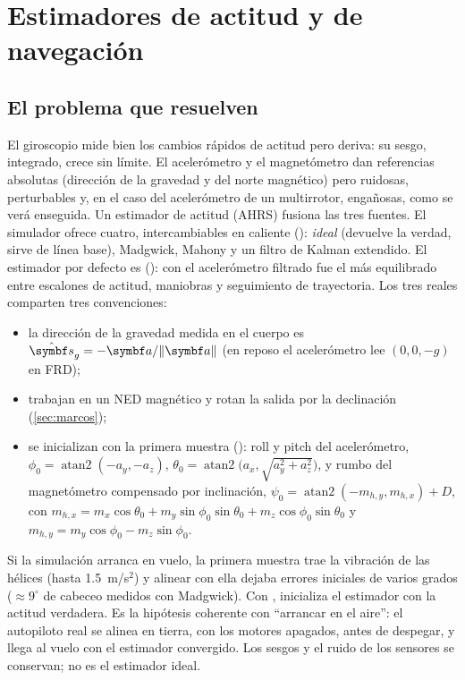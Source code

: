 \section{Estimadores de actitud y de navegación}
\label{sec:estimadores}

\subsection{El problema que resuelven}

El giroscopio mide bien los cambios rápidos de actitud pero deriva: su
sesgo, integrado, crece sin límite. El acelerómetro y el magnetómetro dan
referencias absolutas (dirección de la gravedad y del norte magnético) pero
ruidosas, perturbables y, en el caso del acelerómetro de un multirrotor,
engañosas, como se verá enseguida. Un estimador de actitud (AHRS) fusiona
las tres fuentes. El simulador ofrece cuatro, intercambiables en caliente
(): \emph{ideal} (devuelve la verdad, sirve de línea
base), Madgwick, Mahony y un filtro de Kalman extendido. El estimador por
defecto es  (): con el acelerómetro
filtrado fue el más equilibrado entre escalones de actitud, maniobras y
seguimiento de trayectoria. Los tres reales comparten tres convenciones:
\begin{itemize}
\item la dirección de la gravedad medida en el cuerpo es
$\hat{\vect s}_g=-\vect a/\|\vect a\|$ (en reposo el acelerómetro lee
$(0,0,-g)$ en FRD);
\item trabajan en un NED magnético y rotan la salida por la declinación
(\cref{sec:marcos});
\item se inicializan con la primera muestra (): roll
y pitch del acelerómetro,
$\phi_0=\operatorname{atan2}(-a_y,-a_z)$,
$\theta_0=\operatorname{atan2}\big(a_x,\sqrt{a_y^2+a_z^2}\big)$, y rumbo del
magnetómetro compensado por inclinación,
$\psi_0=\operatorname{atan2}(-m_{h,y},m_{h,x})+D$, con
$m_{h,x}=m_x\cos\theta_0+m_y\sin\phi_0\sin\theta_0+m_z\cos\phi_0\sin\theta_0$ y
$m_{h,y}=m_y\cos\phi_0-m_z\sin\phi_0$.
\end{itemize}

\begin{nota}
Si la simulación arranca en vuelo, la primera muestra trae la vibración de
las hélices (hasta 1.5~m/s$^2$) y alinear con ella dejaba errores iniciales
de varios grados ($\approx9^\circ$ de cabeceo medidos con Madgwick). Con
,  inicializa el
estimador con la actitud verdadera. Es la hipótesis coherente con ``arrancar
en el aire'': el autopiloto real se alinea en tierra, con los motores
apagados, antes de despegar, y llega al vuelo con el estimador convergido.
Los sesgos y el ruido de los sensores se conservan; no es el estimador ideal.
\end{nota}

